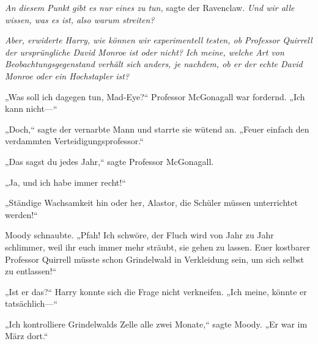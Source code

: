 \emph{An diesem Punkt gibt es nur eines zu tun,} sagte der Ravenclaw. \emph{Und wir alle wissen, was es ist, also warum streiten?}

\emph{Aber, erwiderte Harry, wie können wir experimentell testen, ob Professor Quirrell der ursprüngliche David Monroe ist oder nicht? Ich meine, welche Art von Beobachtungsgegenstand verhält sich anders, je nachdem, ob er der echte David Monroe oder ein Hochstapler ist?}

„Was soll ich dagegen tun, Mad-Eye?“ Professor McGonagall war fordernd. „Ich kann nicht—“

„Doch,“ sagte der vernarbte Mann und starrte sie wütend an. „Feuer einfach den verdammten Verteidigungsprofessor.“

„Das sagst du jedes Jahr,“ sagte Professor McGonagall.

„Ja, und ich habe immer recht!“

„Ständige Wachsamkeit hin oder her, Alastor, die Schüler müssen unterrichtet werden!“

Moody schnaubte. „Pfah! Ich schwöre, der Fluch wird von Jahr zu Jahr schlimmer, weil ihr euch immer mehr sträubt, sie gehen zu lassen. Euer kostbarer Professor Quirrell müsste schon Grindelwald in Verkleidung sein, um sich selbst zu entlassen!“

„Ist er das?“ Harry konnte sich die Frage nicht verkneifen. „Ich meine, könnte er tatsächlich—“

„Ich kontrolliere Grindelwalds Zelle alle zwei Monate,“ sagte Moody. „Er war im März dort.“

